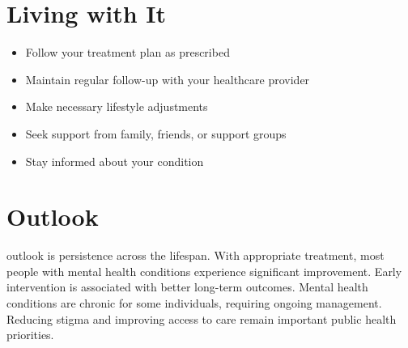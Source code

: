 \section{Living with It}
\begin{itemize}[noitemsep]
  \item Follow your treatment plan as prescribed
  \item Maintain regular follow-up with your healthcare provider
  \item Make necessary lifestyle adjustments
  \item Seek support from family, friends, or support groups
  \item Stay informed about your condition
\end{itemize}
\section{Outlook}
outlook is persistence across the lifespan. With appropriate treatment, most people with mental health conditions experience significant improvement. Early intervention is associated with better long-term outcomes. Mental health conditions are chronic for some individuals, requiring ongoing management. Reducing stigma and improving access to care remain important public health priorities.
